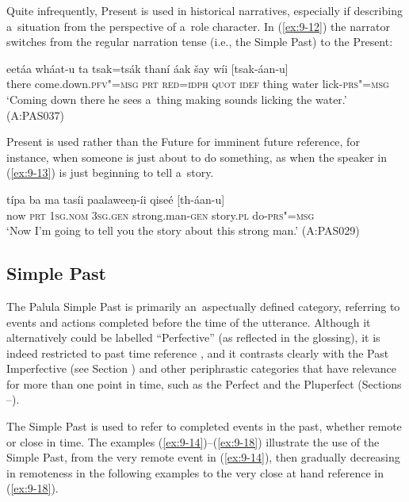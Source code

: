 Quite infrequently, Present is used in historical narratives, especially if describing a~situation from the perspective of a~role character. In (\ref{ex:9-12}) the narrator switches from the regular narration tense (i.e., the Simple Past) to the Present:

\begin{exe}
\ex
\label{ex:9-12}
\gll eetáa wháat-u ta tsak=tsák thaní áak šay wíi [tsak-áan-u]\\
there come.down.\textsc{pfv"=msg} \textsc{prt} \textsc{red}=\textsc{idph} \textsc{quot} \textsc{idef}  thing water lick-\textsc{prs"=msg}\\
\glt `Coming down there he sees a~thing making sounds licking the water.' (A:PAS037)
\end{exe}

Present is used rather than the Future for imminent future reference, for instance, when someone is just about to do something, as when the speaker in (\ref{ex:9-13}) is just beginning to tell a~story.

\begin{exe}
\ex
\label{ex:9-13}
\gll típa ba ma tasíi paalaweeṇ-íi qiseé [th-áan-u] \\
now \textsc{prt} 1\textsc{sg.nom} 3\textsc{sg.gen} strong.man-\textsc{gen} story.\textsc{pl} do-\textsc{prs"=msg} \\
\glt `Now I'm going to tell you the story about this strong man.' (A:PAS029)
\end{exe}

\subsection{Simple Past}
\label{subsec:9-1-4}


The Palula Simple Past is primarily an~aspectually defined category, referring to events and actions completed before the time of the utterance. Although it alternatively could be labelled ``Perfective'' (as reflected in the glossing), it is indeed restricted to past time reference \citep[79]{dahl1985}, and it contrasts clearly with the Past Imperfective (see Section ) and other periphrastic categories that have relevance for more than one point in time, such as the Perfect and the Pluperfect (Sections --).



The Simple Past is used to refer to completed events in the past, whether remote or close in time. The examples (\ref{ex:9-14})--(\ref{ex:9-18}) illustrate the use of the Simple Past, from the very remote event in (\ref{ex:9-14}), then gradually decreasing in remoteness in the following examples to the very close at hand reference in (\ref{ex:9-18}).

